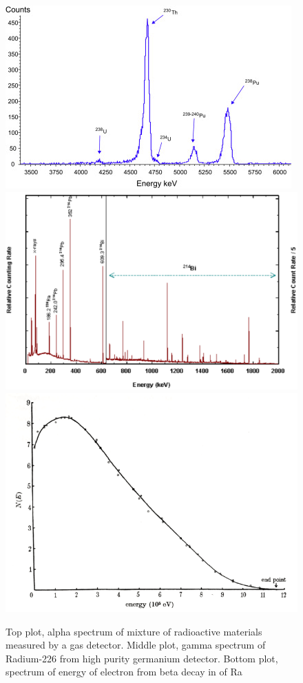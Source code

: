 \begin{figure}[!htb]
\centering
\includegraphics[scale=0.8]{Figures/Chapter1/alphaspectrum.jpg}
\includegraphics[scale=0.2]{Figures/Chapter1/radspec_gamma.png}
\includegraphics[scale=0.25]{Figures/Chapter1/Ra_betaSpec.png}

        \caption{Top plot, alpha spectrum of mixture of radioactive materials measured by a gas detector\cite{alphaSpectrum}. Middle plot, gamma spectrum of Radium-226 from high purity germanium detector\cite{RaSpectrum_gamma}. Bottom plot, spectrum of energy of electron from beta decay in of Ra\cite{Ra_betaSpec}} 
\label{fig:abgSpectrum}
\end{figure}

